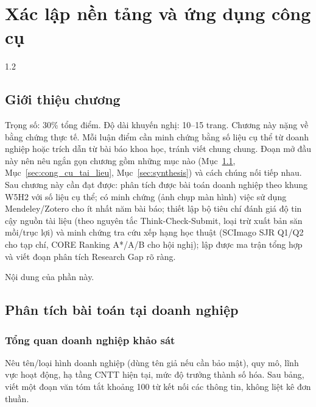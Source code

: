 
\chapter{Xác lập nền tảng và ứng dụng công cụ}
\label{ch:chuong2}

\begin{spacing}{1.2}

\section*{Giới thiệu chương}

\begin{huongdan}
Trọng số: 30\% tổng điểm. Độ dài khuyến nghị: 10--15 trang. Chương này nặng về bằng chứng thực tế. Mỗi luận điểm cần minh chứng bằng số liệu cụ thể từ doanh nghiệp hoặc trích dẫn từ bài báo khoa học, tránh viết chung chung. Đoạn mở đầu này nên nêu ngắn gọn chương gồm những mục nào (Mục~\ref{sec:bai_toan_dn}, Mục~\ref{sec:cong_cu_tai_lieu}, Mục~\ref{sec:synthesis}) và cách chúng nối tiếp nhau. Sau chương này cần đạt được: phân tích được bài toán doanh nghiệp theo khung W5H2 với số liệu cụ thể; có minh chứng (ảnh chụp màn hình) việc sử dụng Mendeley/Zotero cho ít nhất năm bài báo; thiết lập bộ tiêu chí đánh giá độ tin cậy nguồn tài liệu (theo nguyên tắc Think-Check-Submit, loại trừ xuất bản săn mồi/trục lợi) và minh chứng tra cứu xếp hạng học thuật (SCImago SJR Q1/Q2 cho tạp chí, CORE Ranking A*/A/B cho hội nghị); lập được ma trận tổng hợp và viết đoạn phân tích Research Gap rõ ràng.
\end{huongdan}

Nội dung của phần này.

\section{Phân tích bài toán tại doanh nghiệp}
\label{sec:bai_toan_dn}

\subsection{Tổng quan doanh nghiệp khảo sát}
\label{subsec:tong_quan_dn}

\begin{huongdan}
Nêu tên/loại hình doanh nghiệp (dùng tên giả nếu cần bảo mật), quy mô, lĩnh vực hoạt động, hạ tầng CNTT hiện tại, mức độ trưởng thành số hóa. Sau bảng, viết một đoạn văn tóm tắt khoảng 100 từ kết nối các thông tin, không liệt kê đơn thuần.
\end{huongdan}


\end{spacing}
